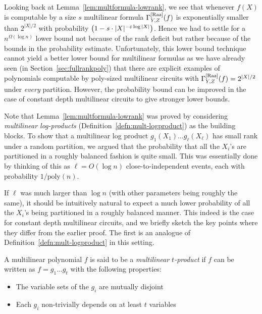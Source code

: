 Looking back at Lemma~\ref{lem:multformula-lowrank}, we see that whenever $f(X)$ is computable by a size $s$ multilinear formula $\Gamma^{\mathrm{[Raz]}}_{Y,Z}(f)$ is exponentially smaller than $2^{|X|/2}$ with probability $\left(1 - s\cdot |X|^{-\varepsilon \log |X|}\right)$. Hence we had to settle for a $n^{\Omega(\log n)}$ lower bound not because of the rank deficit but rather because of the bounds in the probability estimate. Unfortunately, this lower bound technique cannot yield a better lower bound for multilinear formulas as we have already seen (in Section~\ref{sec:fullrankpoly}) that there are explicit examples of polynomials computable by poly-sized multilinear circuits with $\Gamma^{\mathrm{[Raz]}}_{Y,Z}(f) = 2^{|X|/2}$ under \emph{every} partition. However, the probability bound can be improved in the case of constant depth multilinear circuits to give stronger lower bounds. 


Note that Lemma~\ref{lem:multformula-lowrank} was proved by considering \emph{multilinear log-products} (Definition~\ref{defn:mult-logproduct}) as the building blocks. To show that a multilinear log product $g_1(X_1)\dots g_{\ell}(X_\ell)$ has small rank under a random partition, we argued that the probability that all the $X_i$'s are partitioned in a roughly balanced fashion is quite small. This was essentially done by thinking of this as $\ell = O(\log n)$ close-to-independent events, each with probability $1/\mathrm{poly}(n)$. 

If $\ell$ was much larger than $\log n$ (with other parameters being roughly the same), it should be intuitively natural to expect a much lower probability of all the $X_i$'s being partitioned in a roughly balanced manner. This indeed is the case for constant depth multilinear circuits, and we briefly sketch the key points where they differ from the earlier proof. The first is an analogue of Definition~\ref{defn:mult-logproduct} in this setting. 

\begin{definition}\label{defn:mult-t-prod}
A multilinear polynomial $f$ is said to be a \emph{multilinear $t$-product} if $f$ can be written as $f = g_1\dots g_t$ with the following properties:
\begin{itemize}
\item The variable sets of the $g_i$ are mutually disjoint
\item Each $g_i$ non-trivially depends on at least $t$ variables
\end{itemize}
\end{definition}

